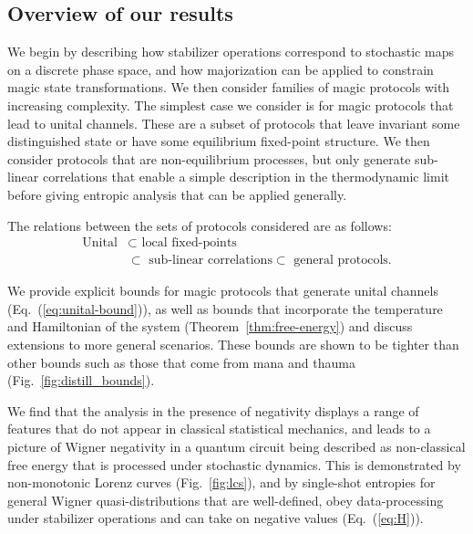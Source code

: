 \documentclass[
onecolumn,
superscriptaddress
]{revtex4-1}
\newcommand{\revhigh}[1]{{\color{red}#1}}
\begin{document}
\subsection*{Overview of our results}
\revhigh{
We begin by describing how stabilizer operations correspond to stochastic maps on a discrete phase space, and how majorization can be applied to constrain magic state transformations. We then consider families of magic protocols with increasing complexity. The simplest case we consider is for magic protocols that lead to unital channels. These are a subset of protocols that leave invariant some distinguished state or have some equilibrium fixed-point structure. We then consider protocols that are non-equilibrium processes, but only generate sub-linear correlations that enable a simple description in the thermodynamic limit before giving entropic analysis that can be applied generally.}

The relations between the sets of protocols considered are as follows:
\begin{align}
\mbox{Unital} &\subset \mbox{ local fixed-points} \nonumber\\ 
&\subset \mbox{ sub-linear correlations} \subset \mbox{ general protocols.} \nonumber
\end{align}

We provide explicit bounds for magic protocols that generate unital channels (Eq.~(\ref{eq:unital-bound})), as well as bounds that incorporate the temperature and Hamiltonian of the system (Theorem~\ref{thm:free-energy}) and discuss extensions to more general scenarios. These bounds are shown to be tighter than other bounds such as those that come from mana and thauma (Fig.~\ref{fig:distill_bounds}). 

We find that the analysis in the presence of negativity displays a range of features that do not appear in classical statistical mechanics, and leads to a picture of Wigner negativity in a quantum circuit being described as non-classical free energy that is processed under stochastic dynamics. This is demonstrated by non-monotonic Lorenz curves (Fig.~\ref{fig:lcs}), and by single-shot entropies for general Wigner quasi-distributions that are well-defined, obey data-processing under stabilizer operations and can take on negative values (Eq.~(\ref{eq:H})).
\end{document}
